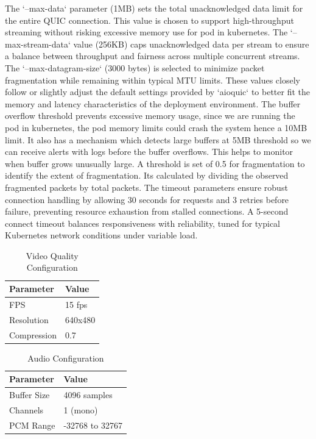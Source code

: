 The `--max-data` parameter (1MB) sets the total unacknowledged data limit for the entire QUIC connection. This value is chosen to support high-throughput streaming without risking excessive memory use for pod in kubernetes. The `--max-stream-data` value (256KB) caps unacknowledged data per stream to ensure a balance between throughput and fairness across multiple concurrent streams. The `--max-datagram-size` (3000 bytes) is selected to minimize packet fragmentation while remaining within typical MTU limits. These values closely follow or slightly adjust the default settings provided by `aioquic` to better fit the memory and latency characteristics of the deployment environment. The buffer overflow threshold prevents excessive memory usage, since we are running the pod in kubernetes, the pod memory limits could crash the system hence a 10MB limit. It also has a mechanism which detects large buffers at 5MB threshold so we can receive alerts with logs before the buffer overflows. This helps to monitor when buffer grows unusually large. A threshold is set of 0.5 for fragmentation to identify the extent of fragmentation. Its calculated by dividing the observed fragmented packets by total packets. The timeout parameters ensure robust connection handling by allowing 30 seconds for requests and 3 retries before failure, preventing resource exhaustion from stalled connections.  
A 5-second connect timeout balances responsiveness with reliability, tuned for typical Kubernetes network conditions under variable load.


\begin{table}[h!]
\centering
\caption{Video Quality Configuration}
\label{tab:video-quality}
\renewcommand{\arraystretch}{1.3}
\begin{tabular}{|l|l|}
\hline
\textbf{Parameter} & \textbf{Value} \\
\hline
FPS & 15 fps \\
\hline
Resolution & 640x480 \\
\hline
Compression & 0.7 \\
\hline
\end{tabular}
\end{table}

\begin{table}[h!]
\centering
\caption{Audio Configuration}
\label{tab:audio-config}
\renewcommand{\arraystretch}{1.3}
\begin{tabular}{|l|l|}
\hline
\textbf{Parameter} & \textbf{Value} \\
\hline
Buffer Size & 4096 samples \\
\hline
Channels & 1 (mono) \\
\hline
PCM Range & -32768 to 32767 \\
\hline
\end{tabular}
\end{table}

